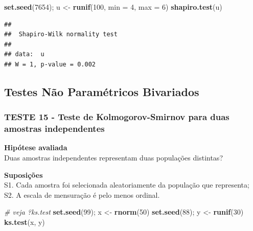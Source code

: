 \documentclass[
]{book}
\newenvironment{Shaded}{\begin{snugshade}}{\end{snugshade}}
\newcommand{\CommentTok}[1]{\textcolor[rgb]{0.56,0.35,0.01}{\textit{#1}}}
\newcommand{\DataTypeTok}[1]{\textcolor[rgb]{0.13,0.29,0.53}{#1}}
\newcommand{\DecValTok}[1]{\textcolor[rgb]{0.00,0.00,0.81}{#1}}
\newcommand{\KeywordTok}[1]{\textcolor[rgb]{0.13,0.29,0.53}{\textbf{#1}}}
\newcommand{\NormalTok}[1]{#1}
\newcommand{\StringTok}[1]{\textcolor[rgb]{0.31,0.60,0.02}{#1}}
\theoremstyle{definition}
\theoremstyle{definition}
\theoremstyle{definition}
\theoremstyle{remark}
\begin{document}
\begin{Shaded}
\begin{Highlighting}[]
\KeywordTok{set.seed}\NormalTok{(}\DecValTok{7654}\NormalTok{); u \textless{}{-}}\StringTok{ }\KeywordTok{runif}\NormalTok{(}\DecValTok{100}\NormalTok{, }\DataTypeTok{min =} \DecValTok{4}\NormalTok{, }\DataTypeTok{max =} \DecValTok{6}\NormalTok{)}
\KeywordTok{shapiro.test}\NormalTok{(u)}
\end{Highlighting}
\end{Shaded}

\begin{verbatim}
## 
##  Shapiro-Wilk normality test
## 
## data:  u
## W = 1, p-value = 0.002
\end{verbatim}

\hypertarget{testes-nuxe3o-paramuxe9tricos-bivariados}{%
\subsection{Testes Não Paramétricos Bivariados}\label{testes-nuxe3o-paramuxe9tricos-bivariados}}

\hypertarget{teste-15---teste-de-kolmogorov-smirnov-para-duas-amostras-independentes}{%
\subsubsection*{TESTE 15 - Teste de Kolmogorov-Smirnov para duas amostras independentes}\label{teste-15---teste-de-kolmogorov-smirnov-para-duas-amostras-independentes}}

\textbf{Hipótese avaliada}\\
Duas amostras independentes representam duas populações distintas?

\textbf{Suposições}\\
S1. Cada amostra foi selecionada aleatoriamente da população que representa;\\
S2. A escala de mensuração é pelo menos ordinal.

\begin{Shaded}
\begin{Highlighting}[]
\CommentTok{\# veja ?ks.test}
\KeywordTok{set.seed}\NormalTok{(}\DecValTok{99}\NormalTok{); x \textless{}{-}}\StringTok{ }\KeywordTok{rnorm}\NormalTok{(}\DecValTok{50}\NormalTok{)}
\KeywordTok{set.seed}\NormalTok{(}\DecValTok{88}\NormalTok{); y \textless{}{-}}\StringTok{ }\KeywordTok{runif}\NormalTok{(}\DecValTok{30}\NormalTok{)}
\KeywordTok{ks.test}\NormalTok{(x, y)}
\end{Highlighting}
\end{Shaded}
\end{document}
